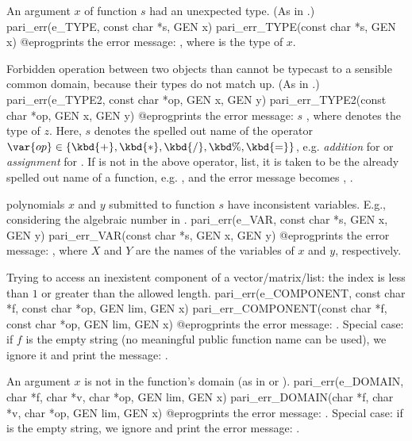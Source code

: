  An argument $x$ of function $s$ had an unexpected type.
(As in .)
\bprog
  pari_err(e_TYPE, const char *s, GEN x)
  pari_err_TYPE(const char *s, GEN x)
@eprog\noindent prints the error message: , where  is the type of $x$.

 Forbidden operation between two objects than cannot be
typecast to a sensible common domain, because their types do not match up.
(As in .)
\bprog
  pari_err(e_TYPE2, const char *op, GEN x, GEN y)
  pari_err_TYPE2(const char *op, GEN x, GEN y)
@eprog\noindent prints the error message:  $s$
  , where  denotes the type of $z$.
Here, $s$ denotes the spelled out name of the operator
$\var{op}\in\{\kbd{+}, \kbd{*}, \kbd{/}, \kbd{\%}, \kbd{=}\}$, e.g.
\emph{addition} for  or \emph{assignment} for . If 
is not in the above operator, list, it is taken to be the already spelled out
name of a function, e.g. , and the error message becomes
  , .

 polynomials $x$ and $y$ submitted to function $s$ have
inconsistent variables. E.g., considering the algebraic number
 in .
\bprog
  pari_err(e_VAR, const char *s, GEN x, GEN y)
  pari_err_VAR(const char *s, GEN x, GEN y)
@eprog\noindent prints the error message: , where $X$ and $Y$ are the names of the variables of $x$ and $y$,
respectively.


 Trying to access an inexistent component of a
vector/matrix/list: the index is less than $1$ or greater
than the allowed length.
\bprog
  pari_err(e_COMPONENT, const char *f, const char *op, GEN lim, GEN x)
  pari_err_COMPONENT(const char *f, const char *op, GEN lim, GEN x)
@eprog\noindent prints the error message: . Special case: if $f$ is the empty string (no
meaningful public function name can be used), we ignore it and print the
message: .

 An argument $x$ is not in the function's domain (as in
 or ).
\bprog
  pari_err(e_DOMAIN, char *f, char *v, char *op, GEN lim, GEN x)
  pari_err_DOMAIN(char *f, char *v, char *op, GEN lim, GEN x)
@eprog\noindent prints the error message: . Special case: if  is the empty string, we ignore
 and print the error message: .

